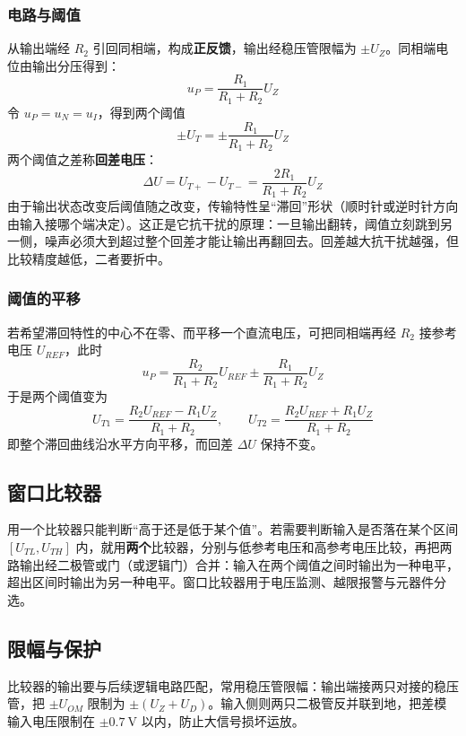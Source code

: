 \subsubsection{电路与阈值}
从输出端经 $R_2$ 引回同相端，构成\textbf{正反馈}，输出经稳压管限幅为 $\pm U_Z$。同相端电位由输出分压得到：
\begin{equation}
u_P=\frac{R_1}{R_1+R_2}U_Z
\end{equation}
令 $u_P=u_N=u_I$，得到两个阈值
\begin{equation}
\pm U_T=\pm\frac{R_1}{R_1+R_2}U_Z
\end{equation}
两个阈值之差称\textbf{回差电压}：
\begin{equation}
\Delta U=U_{T+}-U_{T-}=\frac{2R_1}{R_1+R_2}U_Z
\end{equation}
由于输出状态改变后阈值随之改变，传输特性呈“滞回”形状（顺时针或逆时针方向由输入接哪个端决定）。这正是它抗干扰的原理：一旦输出翻转，阈值立刻跳到另一侧，噪声必须大到超过整个回差才能让输出再翻回去。回差越大抗干扰越强，但比较精度越低，二者要折中。

\subsubsection{阈值的平移}
若希望滞回特性的中心不在零、而平移一个直流电压，可把同相端再经 $R_2$ 接参考电压 $U_{REF}$，此时
\begin{equation}
u_P=\frac{R_2}{R_1+R_2}U_{REF}\pm\frac{R_1}{R_1+R_2}U_Z
\end{equation}
于是两个阈值变为
\begin{equation}
U_{T1}=\frac{R_2U_{REF}-R_1U_Z}{R_1+R_2},\qquad
U_{T2}=\frac{R_2U_{REF}+R_1U_Z}{R_1+R_2}
\end{equation}
即整个滞回曲线沿水平方向平移，而回差 $\Delta U$ 保持不变。

\subsection{窗口比较器}
用一个比较器只能判断“高于还是低于某个值”。若需要判断输入是否落在某个区间 $[U_{TL},U_{TH}]$ 内，就用\textbf{两个}比较器，分别与低参考电压和高参考电压比较，再把两路输出经二极管或门（或逻辑门）合并：输入在两个阈值之间时输出为一种电平，超出区间时输出为另一种电平。窗口比较器用于电压监测、越限报警与元器件分选。

\subsection{限幅与保护}
比较器的输出要与后续逻辑电路匹配，常用稳压管限幅：输出端接两只对接的稳压管，把 $\pm U_{OM}$ 限制为 $\pm(U_Z+U_D)$。输入侧则两只二极管反并联到地，把差模输入电压限制在 $\pm0.7\ \mathrm{V}$ 以内，防止大信号损坏运放。

